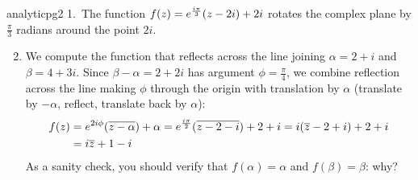 \begin{examples}{}{analyticpg2}
\hangindent\leftmargini
\textup{1.}\ The function $f(z)=e^{\frac{i\pi}{3}}(z-2i)+2i$ rotates the complex plane by $\frac\pi 3$ radians around the point $2i$.
\begin{enumerate}\setcounter{enumi}{1}
  \item\label{ex:reflect2} We compute the function that reflects across the line joining $\alpha=2+i$ and $\beta=4+3i$.\smallbreak
  Since $\beta-\alpha=2+2i$ has argument $\phi=\frac\pi 4$, we combine reflection across the line making $\phi$ through the origin with translation by $\alpha$ (translate by $-\alpha$, reflect, translate back by $\alpha$):
  \begin{align*}
  f(z)&=e^{2i\phi}(\overline{z-\alpha})+\alpha =e^{\frac{i\pi}{2}}(\overline{z-2-i})+2+i=i(\overline{z}-2+i)+2+i\\
  &=i\overline{z}+1-i
  \end{align*}
  As a sanity check, you should verify that $f(\alpha)=\alpha$ and $f(\beta)=\beta$: why?
\end{enumerate}
\end{examples}

